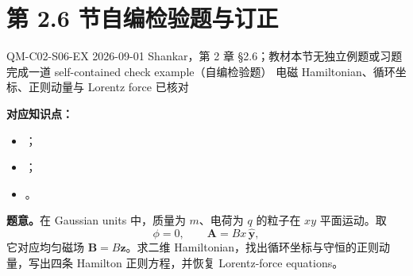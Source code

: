 \section{第 2.6 节自编检验题与订正}
\label{exercise-set:QM-C02-S06}

\exercisemeta
  {QM-C02-S06-EX}
  {2026-09-01}
  {Shankar，第 2 章 \S 2.6；教材本节无独立例题或习题}
  {完成一道 self-contained check example（自编检验题）}
  {电磁 Hamiltonian、循环坐标、正则动量与 Lorentz force 已核对}


\textbf{对应知识点：}
\begin{itemize}[leftmargin=*]
  \item {}；
  \item {}；
  \item {}。
\end{itemize}

\textbf{题意。}在 Gaussian units 中，质量为 $m$、电荷为 $q$ 的粒子在 $xy$ 平面运动。取
\begin{equation}
  \phi=0,
  \qquad
  \bm A=Bx\,\hat{\bm y},
  \label{eq:QM-C02-S06-E01-landau-gauge}
\end{equation}
它对应均匀磁场 $\bm B=B\hat{\bm z}$。求二维 Hamiltonian，找出循环坐标与守恒的正则动量，写出四条 Hamilton 正则方程，并恢复 Lorentz-force equations。

